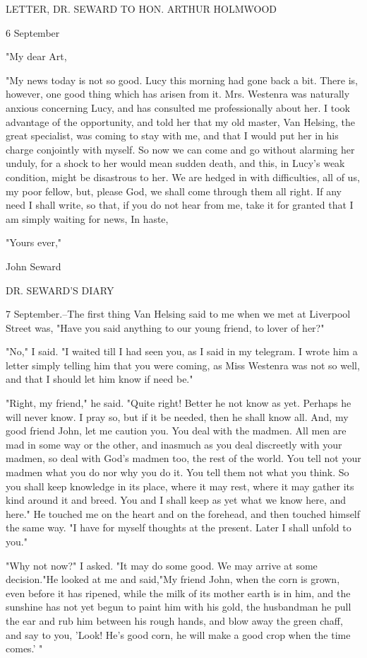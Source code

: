 LETTER, DR. SEWARD TO HON. ARTHUR HOLMWOOD 

6 September 

"My dear Art, 

"My news today is not so good. Lucy this morning had gone back a bit. There is, however, one good thing which has arisen from it. Mrs. Westenra was naturally anxious concerning Lucy, and has consulted me professionally about her. I took advantage of the opportunity, and told her that my old master, Van Helsing, the great specialist, was coming to stay with me, and that I would put her in his charge conjointly with myself. So now we can come and go without alarming her unduly, for a shock to her would mean sudden death, and this, in Lucy's weak condition, might be disastrous to her. We are hedged in with difficulties, all of us, my poor fellow, but, please God, we shall come through them all right. If any need I shall write, so that, if you do not hear from me, take it for granted that I am simply waiting for news, In haste, 

"Yours ever," 

John Seward 

DR. SEWARD'S DIARY 

7 September.--The first thing Van Helsing said to me when we met at Liverpool Street was, "Have you said anything to our young friend, to lover of her?" 

"No," I said. "I waited till I had seen you, as I said in my telegram. I wrote him a letter simply telling him that you were coming, as Miss Westenra was not so well, and that I should let him know if need be." 

"Right, my friend," he said. "Quite right! Better he not know as yet. Perhaps he will never know. I pray so, but if it be needed, then he shall know all. And, my good friend John, let me caution you. You deal with the madmen. All men are mad in some way or the other, and inasmuch as you deal discreetly with your madmen, so deal with God's madmen too, the rest of the world. You tell not your madmen what you do nor why you do it. You tell them not what you think. So you shall keep knowledge in its place, where it may rest, where it may gather its kind around it and breed. You and I shall keep as yet what we know here, and here." He touched me on the heart and on the forehead, and then touched himself the same way. "I have for myself thoughts at the present. Later I shall unfold to you." 

"Why not now?" I asked. "It may do some good. We may arrive at some decision."He looked at me and said,"My friend John, when the corn is grown, even before it has ripened, while the milk of its mother earth is in him, and the sunshine has not yet begun to paint him with his gold, the husbandman he pull the ear and rub him between his rough hands, and blow away the green chaff, and say to you, 'Look! He's good corn, he will make a good crop when the time comes.' " 


